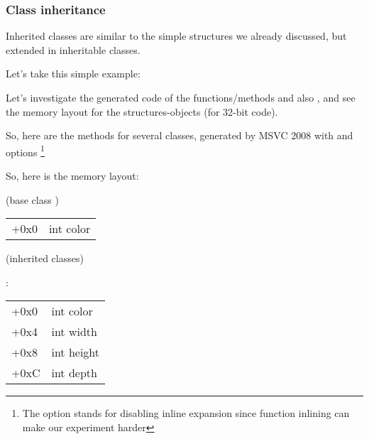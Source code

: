 \subsubsection{Class inheritance}
\label{cpp_inheritance}


Inherited classes are similar to the simple structures we already discussed, but extended 
in inheritable classes.

Let's take this simple example:




Let's investigate the generated code of the  functions/methods and also ,
and see the memory layout for the structures-objects (for 32-bit code).


So, here are the  methods for several classes, generated by MSVC 2008 with \Ox and \Obzero options
\footnote{
The \Obzero option stands for disabling inline expansion since function inlining
can make our experiment harder}







So, here is the memory layout:

(base class )

\begin{center}
\begin{tabular}{ | l | l | }
\hline
  \tableheader{} \\
\hline
  +0x0 & int color \\
\hline
\end{tabular}
\end{center}

(inherited classes)

:

\begin{center}
\begin{tabular}{ | l | l | }
\hline
  \tableheader{} \\
\hline
  +0x0 & int color \\
\hline
  +0x4 & int width \\
\hline
  +0x8 & int height \\
\hline
  +0xC & int depth \\
\hline
\end{tabular}
\end{center}

